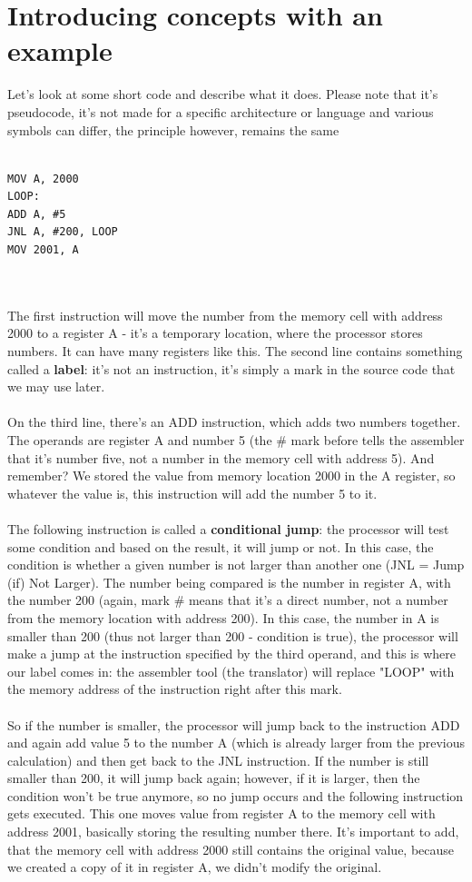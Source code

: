 \documentclass[10pt,a4paper]{book}
\begin{document}
\section{Introducing concepts with an example}
Let's look at some short code and describe what it does. Please note that it's pseudocode, it's not made for a specific architecture or language and various symbols can differ, the principle however, remains the same\\\\
\begin{verbatim}
MOV A, 2000
LOOP:
ADD A, #5
JNL A, #200, LOOP
MOV 2001, A
\end{verbatim}
\\\\
The first instruction will move the number from the memory cell with address 2000 to a register A - it's a temporary location, where the processor stores numbers. It can have many registers like this. The second line contains something called a \textbf{label}: it's not an instruction, it's simply a mark in the source code that we may use later.\\\\
On the third line, there's an ADD instruction, which adds two numbers together. The operands are register A and number 5 (the \# mark before tells the assembler that it's number five, not a number in the memory cell with address 5). And remember? We stored the value from memory location 2000 in the A register, so whatever the value is, this instruction will add the number 5 to it.\\\\
The following instruction is called a \textbf{conditional jump}: the processor will test some condition and based on the result, it will jump or not. In this case, the condition is whether a given number is not larger than another one (JNL = Jump (if) Not Larger). The number being compared is the number in register A, with the number 200 (again, mark \# means that it's a direct number, not a number from the memory location with address 200). In this case, the number in A is smaller than 200 (thus not larger than 200 - condition is true), the processor will make a jump at the instruction specified by the third operand, and this is where our label comes in: the assembler tool (the translator) will replace "LOOP" with the memory address of the instruction right after this mark.\\\\
So if the number is smaller, the processor will jump back to the instruction ADD and again add value 5 to the number A (which is already larger from the previous calculation) and then get back to the JNL instruction. If the number is still smaller than 200, it will jump back again; however, if it is larger, then the condition won't be true anymore, so no jump occurs and the following instruction gets executed. This one moves value from register A to the memory cell with address 2001, basically storing the resulting number there. It's important to add, that the memory cell with address 2000 still contains the original value, because we created a copy of it in register A, we didn't modify the original.
\newpage
\end{document}
